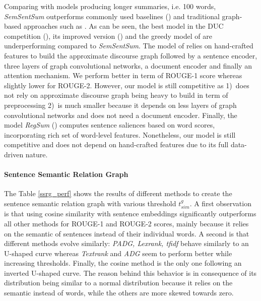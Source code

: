 \documentclass{article}
\begin{document}
Comparing with models producing longer summaries, i.e. 100 words, \textit{SemSentSum} outperforms commonly used baselines (\citet{Nenkova2006})
 and traditional graph-based approaches such as \citet{radev2004centroid, erkan2004lexrank, christensen2013towards}. As can be seen, the best model in the DUC competition (\citet{conroy2004left}), its improved version (\citet{conroy2011classy}) and the greedy model of \citet{Haghighi2009} are underperforming compared to \textit{SemSentSum}. The model of \citet{Yasunaga17} relies on hand-crafted features to build the approximate discourse graph followed by a sentence encoder, three layers of graph convolutional networks, a document encoder and finally an attention mechanism. We perform better in term of ROUGE-1 score whereas slightly lower for ROUGE-2. However, our model is still competitive as 1)~does not rely on approximate discourse graph being heavy to build in term of preprocessing 2)~is much smaller because it depends on less layers of graph convolutional networks and does not need a document encoder. Finally, the model \textit{RegSum} (\citet{hong2014improving}) computes sentence saliences based on word scores, incorporating rich set of word-level features. Nonetheless, our model is still competitive and does not depend on hand-crafted features due to its full data-driven nature.

\paragraph{Sentence Semantic Relation Graph}
The Table \ref{ssrg_perf} shows the results of different methods to create the sentence semantic relation graph with various threshold $t_{sim}^g$. A first observation is that using cosine similarity with sentence embeddings significantly outperforms all other methods for ROUGE-1 and ROUGE-2 scores, mainly because it relies on the semantic of sentences instead of their individual words. A second is that different methods evolve similarly: \textit{PADG, Lexrank, tfidf} behave similarly to an U-shaped curve whereas \textit{Textrank} and \textit{ADG} seem to perform better while increasing thresholds. Finally, the cosine method is the only one following an inverted U-shaped curve. The reason behind this behavior is in consequence of its distribution being similar to a normal distribution because it relies on the semantic instead of words, while the others are more skewed towards zero.
\end{document}
